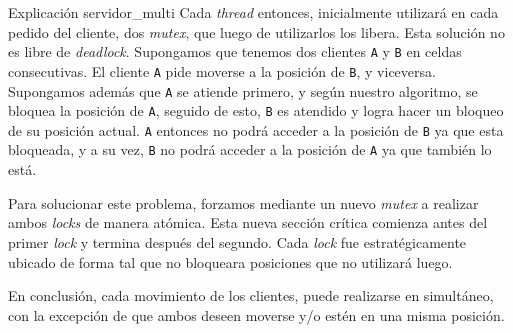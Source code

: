 \documentclass[12pt,titlepage]{article}
\newcommand{\code}[1]{\texttt{#1}}
\newcommand{\kw}[1]{{\em #1}}
\begin{document}
\begin{section}{Explicación servidor\_multi}
	Cada \kw{thread} entonces, inicialmente utilizará en cada pedido del cliente, dos \kw{mutex}, que luego de utilizarlos los libera. Esta solución no es libre de \kw{deadlock}. Supongamos que tenemos dos clientes \code{A} y \code{B} en celdas consecutivas. El cliente \code{A} pide moverse a la posición de \code{B}, y viceversa. Supongamos además que \code{A} se atiende primero, y según nuestro algoritmo, se bloquea la posición de \code{A}, seguido de esto, \code{B} es atendido y logra hacer un bloqueo de su posición actual. \code{A} entonces no podrá acceder a la posición de \code{B} ya que esta bloqueada, y a su vez, \code{B} no podrá acceder a la posición de \code{A} ya que también lo está. 
	
	Para solucionar este problema, forzamos mediante un nuevo \kw{mutex} a realizar ambos \kw{locks} de manera atómica. Esta nueva sección crítica comienza antes del primer \kw{lock} y termina después del segundo. Cada \kw{lock} fue estratégicamente ubicado de forma tal que no bloqueara posiciones que no utilizará luego.
	
	En conclusión, cada movimiento de los clientes, puede realizarse en simultáneo, con la excepción de que ambos deseen moverse y/o estén en una misma posición.
	 
\end{section}
\end{document}
